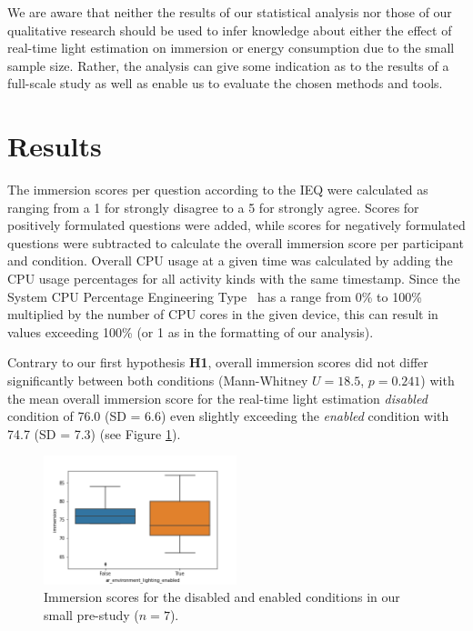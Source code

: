 \documentclass[12pt,twoside,english]{article}
\begin{document}
We are aware that neither the results of our statistical analysis nor those of our qualitative research should be used to infer knowledge about either the effect of real-time light estimation on immersion or energy consumption due to the small sample size.
Rather, the analysis can give some indication as to the results of a full-scale study as well as enable us to evaluate the chosen methods and tools.

\section{Results}
\label{sect:results}

The immersion scores per question according to the \gls{IEQ} were calculated as ranging from a 1 for strongly disagree to a 5 for strongly agree.
Scores for positively formulated questions were added, while scores for negatively formulated questions were subtracted to calculate the overall immersion score per participant and condition.
Overall \gls{CPU} usage at a given time was calculated by adding the \gls{CPU} usage percentages for all activity kinds with the same timestamp.
Since the System CPU Percentage Engineering Type~\cite{apple_system_2020} has a range from 0\% to 100\% multiplied by the number of \gls{CPU} cores in the given device, this can result in values exceeding 100\% (or 1 as in the formatting of our analysis).

Contrary to our first hypothesis \textbf{H1}, overall immersion scores did not differ significantly between both conditions (Mann-Whitney $ U = 18.5 $, $ p = 0.241 $) with the mean overall immersion score for the real-time light estimation \textit{disabled} condition of 76.0 (SD = 6.6) even slightly exceeding the \textit{enabled} condition with 74.7 (SD = 7.3) (see Figure \ref{fig:immersion_plot}).

\begin{figure}[h]
    \centering
    \includegraphics[width=0.5\textwidth]{imgs/immersion_plot}
    \caption{Immersion scores for the disabled and enabled conditions in our small pre-study ($ n = 7 $).}
    \label{fig:immersion_plot}
\end{figure}
\end{document}
